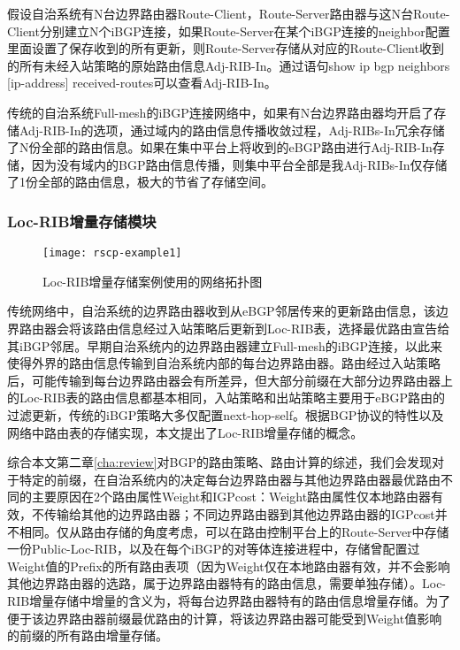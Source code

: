 假设自治系统有N台边界路由器Route-Client，Route-Server路由器与这N台Route-Client分别建立N个iBGP连接，如果Route-Server在某个iBGP连接的neighbor配置里面设置了保存收到的所有更新，则Route-Server存储从对应的Route-Client收到的所有未经入站策略的原始路由信息Adj-RIB-In。通过语句show ip bgp neighbors [ip-address] received-routes可以查看Adj-RIB-In。

传统的自治系统Full-mesh的iBGP连接网络中，如果有N台边界路由器均开启了存储Adj-RIB-In的选项，通过域内的路由信息传播收敛过程，Adj-RIBs-In冗余存储了N份全部的路由信息。如果在集中平台上将收到的eBGP路由进行Adj-RIB-In存储，因为没有域内的BGP路由信息传播，则集中平台全部是我Adj-RIBs-In仅存储了1份全部的路由信息，极大的节省了存储空间。

\subsubsection{Loc-RIB增量存储模块}

\begin{figure}
  \centering
  \texttt{[image: rscp-example1]}
  \caption{Loc-RIB增量存储案例使用的网络拓扑图}
  \label{fig:rscp-example1}
\end{figure}

传统网络中，自治系统的边界路由器收到从eBGP邻居传来的更新路由信息，该边界路由器会将该路由信息经过入站策略后更新到Loc-RIB表，选择最优路由宣告给其iBGP邻居。早期自治系统内的边界路由器建立Full-mesh的iBGP连接，以此来使得外界的路由信息传输到自治系统内部的每台边界路由器。路由经过入站策略后，可能传输到每台边界路由器会有所差异，但大部分前缀在大部分边界路由器上的Loc-RIB表的路由信息都基本相同，入站策略和出站策略主要用于eBGP路由的过滤更新，传统的iBGP策略大多仅配置next-hop-self。根据BGP协议的特性以及网络中路由表的存储实现，本文提出了Loc-RIB增量存储的概念。

综合本文第二章\ref{cha:review}对BGP的路由策略、路由计算的综述，我们会发现对于特定的前缀，在自治系统内的决定每台边界路由器与其他边界路由器最优路由不同的主要原因在2个路由属性Weight和IGPcost：Weight路由属性仅本地路由器有效，不传输给其他的边界路由器；不同边界路由器到其他边界路由器的IGPcost并不相同。仅从路由存储的角度考虑，可以在路由控制平台上的Route-Server中存储一份Public-Loc-RIB，以及在每个iBGP的对等体连接进程中，存储曾配置过Weight值的Prefix的所有路由表项（因为Weight仅在本地路由器有效，并不会影响其他边界路由器的选路，属于边界路由器特有的路由信息，需要单独存储）。Loc-RIB增量存储中增量的含义为，将每台边界路由器特有的路由信息增量存储。为了便于该边界路由器前缀最优路由的计算，将该边界路由器可能受到Weight值影响的前缀的所有路由增量存储。



